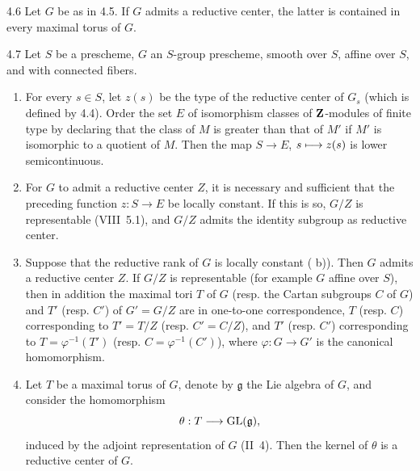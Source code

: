 \begin{corollary}{4.6}\label{XII.4.6}
Let $G$ be as in 4.5. If $G$ admits a reductive center, the latter is contained in every maximal torus of $G$.
\end{corollary}
\begin{theorem}{4.7}\label{XII.4.7}
Let $S$ be a prescheme, $G$ an $S$-group prescheme, smooth over $S$, affine over $S$, and with connected fibers.
\begin{enumerate}[label=\alph*)]
\item For every $s\in S$, let $z(s)$ be the type of the reductive center of $G_s$ (which is defined by 4.4). Order the set $E$ of isomorphism classes of $\mathbf{Z}$-modules of finite type by declaring that the class of $M$ is greater than that of $M'$ if $M'$ is isomorphic to a quotient of $M$. Then the map $S\to E$, $s\longmapsto z(s)$ is lower semicontinuous.
\item For $G$ to admit a reductive center $Z$, it is necessary and sufficient that the preceding function $z:S\to E$ be locally constant. If this is so, $G/Z$ is representable (\cf VIII~5.1), and $G/Z$ admits the identity subgroup as reductive center.
\item Suppose that the reductive rank of $G$ is locally constant ( b)). Then $G$ admits a reductive center $Z$. If $G/Z$ is representable (for example $G$ affine over $S$), then in addition the maximal tori $T$ of $G$ (resp. the Cartan subgroups $C$ of $G$) and $T'$ (resp. $C'$) of $G'=G/Z$ are in one-to-one correspondence, $T$ (resp. $C$) corresponding to $T'=T/Z$ (resp. $C'=C/Z$), and $T'$ (resp. $C'$) corresponding to $T=\varphi^{-1}(T')$ (resp. $C=\varphi^{-1}(C')$), where $\varphi:G\to G'$ is the canonical homomorphism.
\item Let $T$ be a maximal torus of $G$, denote by $\mathfrak g$ the Lie algebra of $G$, and consider the homomorphism
\[
\theta:T\longrightarrow\operatorname{GL}(\mathfrak g),
\]
induced by the adjoint representation of $G$ (II~4). Then the kernel of $\theta$ is a reductive center of $G$.
\end{enumerate}
\end{theorem}
